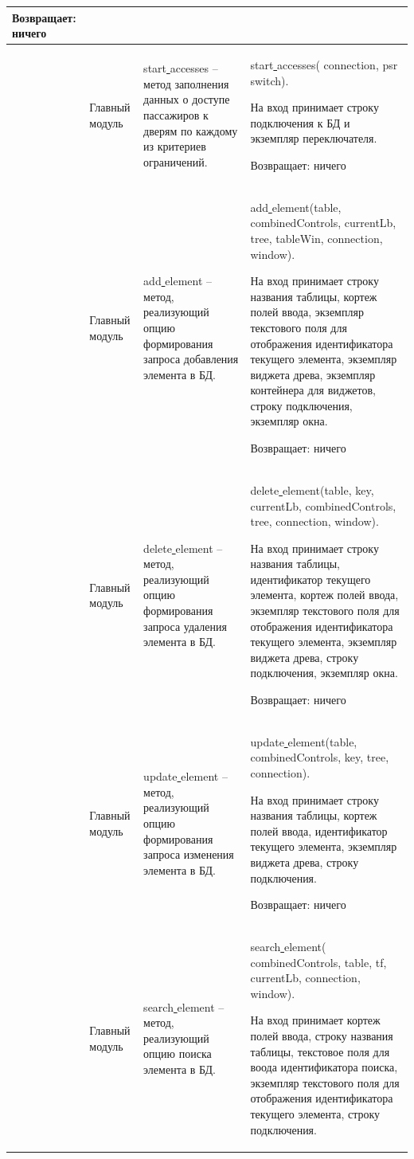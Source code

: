 \begin{xltabular}{\textwidth}{|X|p{2.5cm}|>{\setlength{\baselineskip}{0.7\baselineskip}}p{4.85cm}|>{\setlength{\baselineskip}{0.7\baselineskip}}p{4.85cm}|}
	Возвращает: ничего\\
	\hline  & Главный модуль & start\underline{ }accesses -- метод заполнения данных о доступе пассажиров к дверям по каждому из критериев ограничений. & start\underline{ }accesses(
	connection, psr\underline{ }switch). 
	
	На вход принимает строку подключения к БД и экземпляр переключателя. 
	
	Возвращает: ничего\\
	\hline  & Главный модуль & add\underline{ }element -- метод, реализующий опцию формирования запроса добавления элемента в БД. & add\underline{ }element(table, combinedControls, currentLb, tree, tableWin, connection, window). 
	
	На вход принимает строку названия таблицы, кортеж полей ввода, экземпляр текстового поля для отображения идентификатора текущего элемента, экземпляр виджета древа, экземпляр контейнера для виджетов, строку подключения, экземпляр окна. 
	
	Возвращает: ничего\\
	\hline  & Главный модуль & delete\underline{ }element -- метод, реализующий опцию формирования запроса удаления элемента в БД. & delete\underline{ }element(table, key, currentLb, combinedControls, tree, connection, window). 
	
	На вход принимает строку названия таблицы, идентификатор текущего элемента, кортеж полей ввода, экземпляр текстового поля для отображения идентификатора текущего элемента, экземпляр виджета древа, строку подключения, экземпляр окна. 
	
	Возвращает: ничего\\
	\hline  & Главный модуль & update\underline{ }element -- метод, реализующий опцию формирования запроса изменения элемента в БД. & update\underline{ }element(table, combinedControls, key, tree, connection). 
	
	На вход принимает строку названия таблицы, кортеж полей ввода,  идентификатор текущего элемента, экземпляр виджета древа, строку подключения.
	
	Возвращает: ничего\\
	\hline  & Главный модуль & search\underline{ }element -- метод, реализующий опцию поиска элемента в БД. & search\underline{ }element(
	combinedControls, table, tf, currentLb, connection, window). 
	
	На вход принимает кортеж полей ввода, строку названия таблицы, текстовое поля для воода идентификатора поиска, экземпляр текстового поля для отображения идентификатора текущего элемента,  строку подключения.
	

\end{xltabular}

